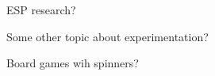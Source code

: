 \def\theTopic{Reading 4}

ESP research?

Some other topic about experimentation?

Board games wih spinners?